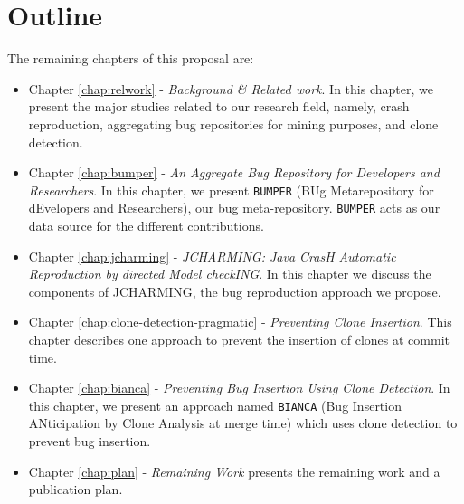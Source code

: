 \section{Outline\label{sec:outline}}

The remaining chapters of this proposal are:

\begin{itemize}
	\item Chapter \ref{chap:relwork} - {\it Background \& Related work}.
	In this chapter, we present the major studies related to our research field, namely, crash reproduction, aggregating bug repositories for mining purposes, and clone detection.

	\item Chapter \ref{chap:bumper} - {\it An Aggregate Bug Repository for Developers and Researchers}.
	In this chapter, we present {\tt BUMPER} (BUg Metarepository for  dEvelopers  and  Researchers), our bug meta-repository. {\tt BUMPER} acts as our data source for the different contributions.

	\item Chapter \ref{chap:jcharming} - {\it JCHARMING: Java CrasH Automatic Reproduction by directed Model checkING}.
	In this chapter we discuss the components of JCHARMING, the bug reproduction approach we propose.

	\item Chapter \ref{chap:clone-detection-pragmatic} - {\it Preventing Clone Insertion}. This chapter describes one approach to     prevent the insertion of clones at commit time.

	\item Chapter \ref{chap:bianca} - {\it Preventing Bug Insertion Using Clone Detection}. In this chapter, we present an approach named {\tt BIANCA} (Bug Insertion ANticipation by Clone Analysis at merge time) which uses clone detection to prevent bug insertion.

	\item Chapter \ref{chap:plan} - {\it Remaining Work} presents  the remaining work and a publication plan.
\end{itemize}
